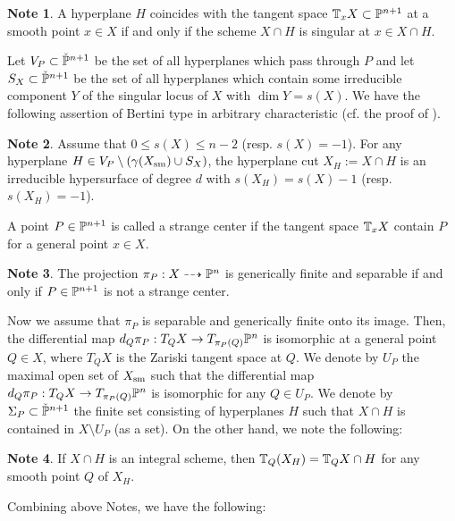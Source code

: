 \documentclass[10pt,oneside]{amsart}
\theoremstyle{definition}
\newtheorem{note}{Note}
\begin{document}
\begin{note} 
A hyperplane $H$ coincides with the tangent space $\Bbb T_xX \subset \Bbb P^{n+1}$ at a smooth point $x \in X$ if and only if the scheme $X \cap H$ is singular at $x \in X \cap H$. 
\end{note} 

Let $V_P \subset \check{\Bbb P}^{n+1}$ be the set of all hyperplanes which pass through $P$ and let $S_X \subset \check{\Bbb P}^{n+1}$ be the set of all hyperplanes which contain some irreducible component $Y$ of the singular locus of $X$ with $\dim Y=s(X)$.  
We have the following assertion of Bertini type in arbitrary characteristic (cf. the proof of \cite[II, 8.18]{hartshorne}). 

\begin{note}
Assume that $0 \le s(X) \le n-2$ (resp. $s(X)=-1$). 
For any hyperplane $H \in V_P \setminus (\gamma(X_{\rm sm}) \cup S_X)$, 
the hyperplane cut $X_H:=X \cap H$ is an irreducible hypersurface of degree $d$ with $s(X_H)=s(X)-1$ (resp. $s(X_H)=-1$). 
\end{note} 

A point $P \in \Bbb P^{n+1}$ is called a strange center if the tangent space $\Bbb T_xX$ contain $P$ for a general point $x \in X$. 

\begin{note}
The projection $\pi_P:X \dashrightarrow \Bbb P^n$ is generically finite and separable if and only if $P \in \Bbb P^{n+1}$ is not a strange center. 
\end{note} 

Now we assume that $\pi_P$ is separable and generically finite onto its image. 
Then, the differential map $d_{Q}\pi_P:T_{Q}X \rightarrow T_{\pi_P(Q)}\Bbb P^n$ is isomorphic at a general point $Q \in X$, where $T_QX$ is the Zariski tangent space at $Q$. 
We denote by $U_P$ the maximal open set of $X_{\rm sm}$ such that the differential map $d_{Q}\pi_P:T_{Q}X \rightarrow T_{\pi_P(Q)}\Bbb P^n$ is isomorphic for any $Q \in U_P$. 
We denote by $\Sigma_P \subset \check{\Bbb P}^{n+1}$ the finite set consisting of hyperplanes $H$ such that $X \cap H$ is contained in $X \setminus U_P$ (as a set). 
On the other hand, we note the following: 
\begin{note} 
If $X \cap H$ is an integral scheme, then $\Bbb T_Q(X_H)=\Bbb T_QX \cap H$ for any smooth point $Q$ of $X_H$. 
\end{note} 

Combining above Notes, we have the following: 
\end{document}
